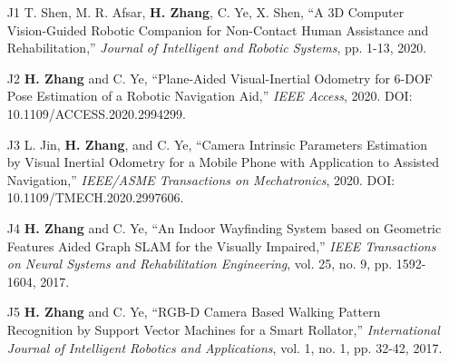 

\begin{justify}
	\begin{itemize}[before=\fontsize{9pt}{1em}\bodyfontlight\upshape\color{text},leftmargin=3ex, nosep, noitemsep]
		\setlength{\parskip}{0pt}
		\renewcommand{\labelitemi}{\bullet}
		\item[J1]{T. Shen, M. R. Afsar, \textbf{H. Zhang}, C. Ye, X. Shen, “A 3D Computer Vision-Guided Robotic Companion for Non-Contact Human Assistance and Rehabilitation,” \emph{Journal of Intelligent and Robotic Systems}, pp. 1-13, 2020.}
		\item[J2]{\textbf{H. Zhang} and C. Ye, “Plane-Aided Visual-Inertial Odometry for 6-DOF Pose Estimation of a Robotic Navigation Aid,” \emph{IEEE Access}, 2020. DOI: 10.1109/ACCESS.2020.2994299.}
		\item[J3]{L. Jin, \textbf{H. Zhang}, and C. Ye, “Camera Intrinsic Parameters Estimation by Visual Inertial Odometry for a Mobile Phone with Application to Assisted Navigation,” \emph{IEEE/ASME Transactions on Mechatronics}, 2020. DOI: 10.1109/TMECH.2020.2997606.}
		\item[J4]{\textbf{H. Zhang} and C. Ye, “An Indoor Wayfinding System based on Geometric Features Aided Graph SLAM for the Visually Impaired,” \emph{IEEE Transactions on Neural Systems and Rehabilitation Engineering}, vol. 25, no. 9, pp. 1592-1604, 2017.}
		\item[J5]{\textbf{H. Zhang} and C. Ye, “RGB-D Camera Based Walking Pattern Recognition by Support Vector Machines for a Smart Rollator,” \emph{International Journal of Intelligent Robotics and Applications}, vol. 1, no. 1, pp. 32-42, 2017.}
	\end{itemize}
\end{justify}


